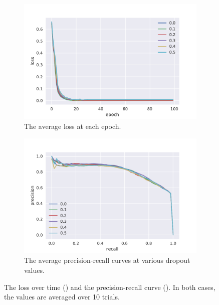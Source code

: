 \begin{figure}[tb]
  \centering
  \begin{subfigure}[t]{0.49\textwidth}
    \centering
    \includegraphics[width=\textwidth]{./figures/results/dropout/losses.pdf}
    \caption{The average loss at each epoch.\\}%
    \label{fig:dropout_loss}
  \end{subfigure}
  \begin{subfigure}[t]{0.49\textwidth}
    \centering
    \includegraphics[width=\textwidth]{./figures/results/dropout/pr.pdf}
    \caption{The average precision-recall curves at various dropout values.}%
    \label{fig:dropout_pr}
  \end{subfigure}
  \caption{The loss over time () and the
    precision-recall curve (). In both cases, the values are
    averaged over 10 trials.}%
    \label{fig:dropout_plots}
\end{figure}

